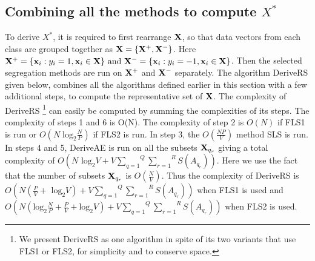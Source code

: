 \documentclass[twoside]{article}
\begin{document}
\subsection{Combining all the methods to compute ${X}^*$}
To derive ${X}^*$, it is required to first rearrange ${\bf X}$, so that data vectors from each class are grouped together as ${\bf X} = \{{\bf X}^+,{\bf X}^-\}$. Here ${\bf X}^+  = \{{\bf x}_i: y_i = 1, {\bf x}_i \in {\bf X}\} \text{ and } {\bf X}^-  = \{{\bf x}_i: y_i = -1, {\bf x}_i \in {\bf X}\}$. Then the selected segregation methods are run on ${\bf X}^+$ and ${\bf X}^-$ separately. The algorithm DeriveRS given below, combines all the algorithms defined earlier in this section with a few additional steps, to compute the representative set of ${\bf X}$. The complexity of DeriveRS \footnote{We present DeriveRS as one algorithm in spite of its two variants that use FLS1 or FLS2, for simplicity and to conserve space.} can easily be computed by summing the complexities of its steps. The complexity of steps 1 and 6 is O(N). The complexity of step 2 is $O(N)$ if FLS1 is run or $O(N \;\text{log}_2 \frac{N}{P})$ if FLS2 is run. In step 3, the $O(\frac{NP}{V})$ method SLS is run. In steps 4 and 5, DeriveAE is run on all the subsets ${\bf X}_{q_r}$ giving a total complexity of $O(N \text{ log}_2 V + V\overset{Q}{\underset{q = 1}{\sum}} \overset{R}{\underset{r = 1}{\sum}} S(A_{q_r}))$. Here we use the fact that the number of subsets ${\bf X}_{q_r}$ is $O(\frac{N}{V})$. Thus the complexity of DeriveRS is $O(N(\frac{P}{V} + \text{ log}_2 V) + V\overset{Q}{\underset{q = 1}{\sum}} \overset{R}{\underset{r = 1}{\sum}} S(A_{q_r}))$ when FLS1 is used and $O(N (\text{log}_2 \frac{N}{P} + \frac{P}{V} + \text{log}_2 V) + V\overset{Q}{\underset{q = 1}{\sum}} \overset{R}{\underset{r = 1}{\sum}} S(A_{q_r}))$ when FLS2 is used.
\end{document}
